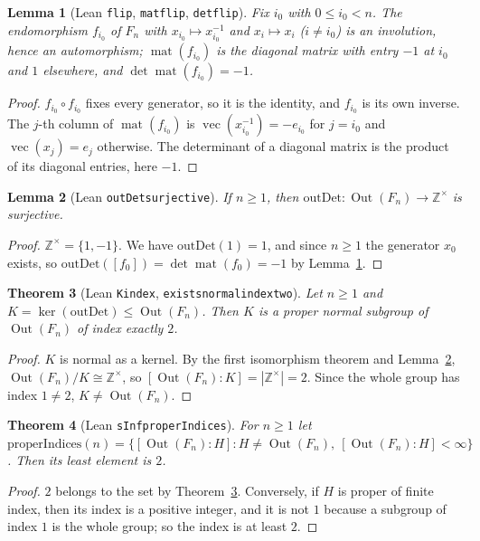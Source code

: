 \documentclass[11pt]{article}
\newtheorem{theorem}{Theorem}
\newtheorem{lemma}[theorem]{Lemma}
\theoremstyle{definition}
\theoremstyle{remark}
\renewcommand{\_}{\oldus\allowbreak}
\newcommand{\Z}{\mathbb{Z}}
\newcommand{\Out}{\operatorname{Out}}
\newcommand{\vect}{\operatorname{vec}}
\newcommand{\mat}{\operatorname{mat}}
\begin{document}
\begin{lemma}[Lean \texttt{flip}, \texttt{mat\_flip}, \texttt{det\_flip}]\label{lem:flip}
Fix $i_0$ with $0\le i_0<n$. The endomorphism $f_{i_0}$ of $F_n$ with $x_{i_0}\mapsto x_{i_0}^{-1}$ and
$x_i\mapsto x_i$ ($i\ne i_0$) is an involution, hence an automorphism; $\mat(f_{i_0})$ is the diagonal
matrix with entry $-1$ at $i_0$ and $1$ elsewhere, and $\det\mat(f_{i_0})=-1$.
\end{lemma}
\begin{proof}
$f_{i_0}\circ f_{i_0}$ fixes every generator, so it is the identity, and $f_{i_0}$ is its own inverse. The
$j$-th column of $\mat(f_{i_0})$ is $\vect(x_{i_0}^{-1})=-e_{i_0}$ for $j=i_0$ and $\vect(x_j)=e_j$
otherwise. The determinant of a diagonal matrix is the product of its diagonal entries, here $-1$.
\end{proof}

\begin{lemma}[Lean \texttt{outDet\_surjective}]\label{lem:surj}
If $n\ge 1$, then $\mathrm{outDet}:\Out(F_n)\to\Z^\times$ is surjective.
\end{lemma}
\begin{proof}
$\Z^\times=\{1,-1\}$. We have $\mathrm{outDet}(1)=1$, and since $n\ge1$ the generator $x_0$ exists, so
$\mathrm{outDet}([f_0])=\det\mat(f_0)=-1$ by Lemma~\ref{lem:flip}.
\end{proof}

\begin{theorem}[Lean \texttt{K\_index}, \texttt{exists\_normal\_index\_two}]\label{thm:K}
Let $n\ge 1$ and $K=\ker(\mathrm{outDet})\le\Out(F_n)$. Then $K$ is a proper normal subgroup of
$\Out(F_n)$ of index exactly $2$.
\end{theorem}
\begin{proof}
$K$ is normal as a kernel. By the first isomorphism theorem and Lemma~\ref{lem:surj},
$\Out(F_n)/K\cong\Z^\times$, so $[\Out(F_n):K]=|\Z^\times|=2$. Since the whole group has index $1\ne 2$,
$K\ne\Out(F_n)$.
\end{proof}

\begin{theorem}[Lean \texttt{sInf\_properIndices}]\label{thm:min}
For $n\ge 1$ let $\mathrm{properIndices}(n)=\{[\Out(F_n):H] : H\ne\Out(F_n),\ [\Out(F_n):H]<\infty\}$. Then
its least element is $2$.
\end{theorem}
\begin{proof}
$2$ belongs to the set by Theorem~\ref{thm:K}. Conversely, if $H$ is proper of finite index, then its index
is a positive integer, and it is not $1$ because a subgroup of index $1$ is the whole group; so the index is
at least $2$.
\end{proof}
\end{document}
